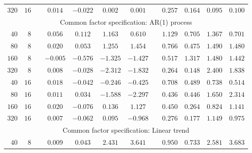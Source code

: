 \documentclass[12pt,fleqn]{article}
\begin{document}
\begin{table}[H]
\begin{tabular}{rrcccccccccc}
   {\small $320$} & {\small $16$} & {\small $$} & {\small $0.014$} & {\small $-0.022$} & {\small $0.002$} & {\small $0.001$} & {\small $$} & {\small $0.257$} & {\small $0.164$} & {\small $0.095$} & {\small $0.100$} \\
   \multicolumn{12}{c}{\small Common factor specification: AR(1) process}\\
   {\small $40$} & {\small $8$} & {\small $$} & {\small $0.056$} & {\small $0.112$} & {\small $1.163$} & {\small $0.610$} & {\small $$} & {\small $1.129$} & {\small $0.705$} & {\small $1.367$} & {\small $0.701$} \\
   {\small $80$} & {\small $8$} & {\small $$} & {\small $0.020$} & {\small $0.053$} & {\small $1.255$} & {\small $1.454$} & {\small $$} & {\small $0.766$} & {\small $0.475$} & {\small $1.490$} & {\small $1.480$} \\
   {\small $160$} & {\small $8$} & {\small $$} & {\small $-0.005$} & {\small $-0.576$} & {\small $-1.325$} & {\small $-1.427$} & {\small $$} & {\small $0.517$} & {\small $1.317$} & {\small $1.480$} & {\small $1.442$} \\
   {\small $320$} & {\small $8$} & {\small $$} & {\small $0.008$} & {\small $-0.028$} & {\small $-2.312$} & {\small $-1.832$} & {\small $$} & {\small $0.264$} & {\small $0.148$} & {\small $2.400$} & {\small $1.838$} \\
   {\small $40$} & {\small $16$} & {\small $$} & {\small $0.018$} & {\small $-0.042$} & {\small $-0.246$} & {\small $-0.425$} & {\small $$} & {\small $0.708$} & {\small $0.489$} & {\small $0.738$} & {\small $0.514$} \\
   {\small $80$} & {\small $16$} & {\small $$} & {\small $0.011$} & {\small $0.034$} & {\small $-1.588$} & {\small $-2.297$} & {\small $$} & {\small $0.436$} & {\small $0.446$} & {\small $1.650$} & {\small $2.314$} \\
   {\small $160$} & {\small $16$} & {\small $$} & {\small $0.020$} & {\small $-0.076$} & {\small $0.136$} & {\small $1.127$} & {\small $$} & {\small $0.450$} & {\small $0.264$} & {\small $0.824$} & {\small $1.141$} \\
   {\small $320$} & {\small $16$} & {\small $$} & {\small $0.007$} & {\small $-0.062$} & {\small $0.095$} & {\small $-0.968$} & {\small $$} & {\small $0.276$} & {\small $0.177$} & {\small $1.149$} & {\small $0.975$} \\
   \multicolumn{12}{c}{\small Common factor specification: Linear trend}\\
   {\small $40$} & {\small $8$} & {\small $$} & {\small $0.009$} & {\small $0.043$} & {\small $2.431$} & {\small $3.641$} & {\small $$} & {\small $0.950$} & {\small $0.733$} & {\small $2.581$} & {\small $3.683$} \\

\end{tabular}
\end{table}
\end{document}
